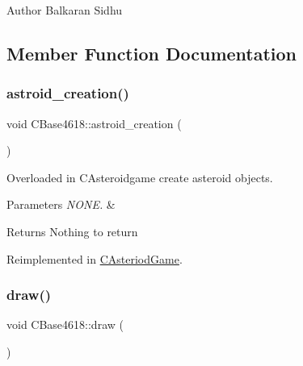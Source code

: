 \begin{DoxyAuthor}{Author}
Balkaran Sidhu 
\end{DoxyAuthor}


\subsection{Member Function Documentation}
\hypertarget{class_c_base4618_a30aae55b21db35e1d70b04659a0feeb9}{}\label{class_c_base4618_a30aae55b21db35e1d70b04659a0feeb9} 
\subsubsection{\texorpdfstring{astroid\+\_\+creation()}{astroid\_creation()}}
{\footnotesize\ttfamily void C\+Base4618\+::astroid\+\_\+creation (\begin{DoxyParamCaption}{ }\end{DoxyParamCaption})\hspace{0.3cm}{\ttfamily [virtual]}}



Overloaded in C\+Asteroidgame create asteroid objects. 


\begin{DoxyParams}{Parameters}
{\em N\+O\+N\+E.} & \\
\hline
\end{DoxyParams}
\begin{DoxyReturn}{Returns}
Nothing to return 
\end{DoxyReturn}


Reimplemented in \hyperlink{class_c_asteriod_game_a787c6be5d95bc54c4c51b33f7da41b0a}{C\+Asteriod\+Game}.

\hypertarget{class_c_base4618_a853327d563d064bb31db241861c4d291}{}\label{class_c_base4618_a853327d563d064bb31db241861c4d291} 
\subsubsection{\texorpdfstring{draw()}{draw()}}
{\footnotesize\ttfamily void C\+Base4618\+::draw (\begin{DoxyParamCaption}{ }\end{DoxyParamCaption})\hspace{0.3cm}{\ttfamily [virtual]}}



